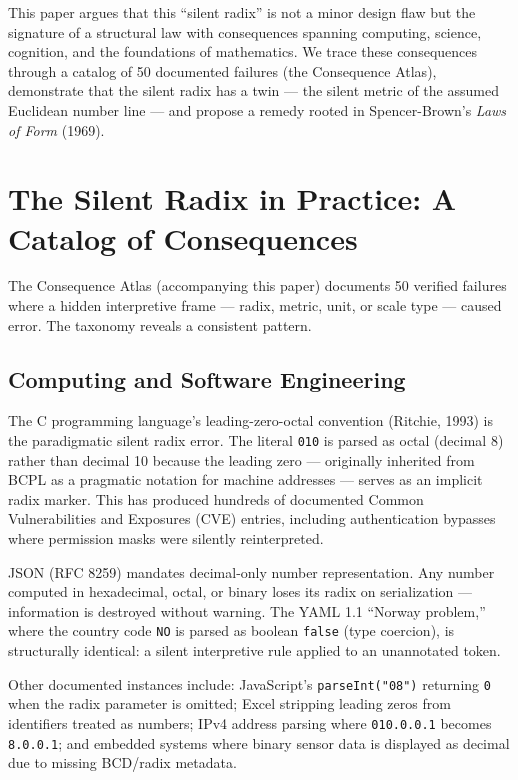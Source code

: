 \documentclass[12pt,a4paper]{article}
\theoremstyle{definition}
\theoremstyle{remark}
\begin{document}
This paper argues that this ``silent radix'' is not a minor design flaw but the
signature of a structural law with consequences spanning computing, science,
cognition, and the foundations of mathematics. We trace these consequences through
a catalog of 50 documented failures (the Consequence Atlas), demonstrate that the
silent radix has a twin --- the silent metric of the assumed Euclidean number line
--- and propose a remedy rooted in Spencer-Brown's \emph{Laws of Form} (1969).

\section{The Silent Radix in Practice: A Catalog of Consequences}

The Consequence Atlas (accompanying this paper) documents 50 verified failures
where a hidden interpretive frame --- radix, metric, unit, or scale type --- caused
error. The taxonomy reveals a consistent pattern.

\subsection{Computing and Software Engineering}

The C programming language's leading-zero-octal convention (Ritchie, 1993) is the
paradigmatic silent radix error. The literal \texttt{010} is parsed as octal
(decimal 8) rather than decimal 10 because the leading zero --- originally
inherited from BCPL as a pragmatic notation for machine addresses --- serves as an
implicit radix marker. This has produced hundreds of documented Common
Vulnerabilities and Exposures (CVE) entries, including authentication bypasses
where permission masks were silently reinterpreted.

JSON (RFC 8259) mandates decimal-only number representation. Any number computed in
hexadecimal, octal, or binary loses its radix on serialization --- information is
destroyed without warning. The YAML 1.1 ``Norway problem,'' where the country code
\texttt{NO} is parsed as boolean \texttt{false} (type coercion), is structurally
identical: a silent interpretive rule applied to an unannotated token.

Other documented instances include: JavaScript's \texttt{parseInt("08")} returning
\texttt{0} when the radix parameter is omitted; Excel stripping leading zeros from
identifiers treated as numbers; IPv4 address parsing where \texttt{010.0.0.1}
becomes \texttt{8.0.0.1}; and embedded systems where binary sensor data is
displayed as decimal due to missing BCD/radix metadata.
\end{document}

